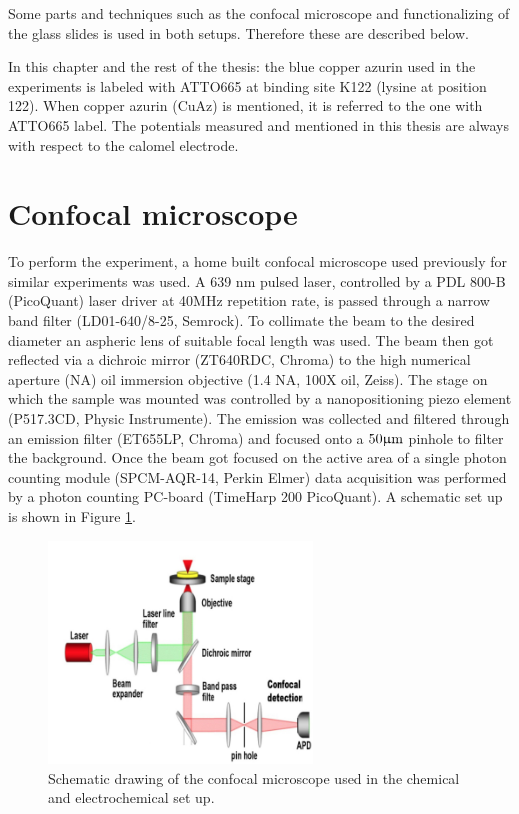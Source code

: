 \documentclass[twoside,single]{lion-msc}
\begin{document}
Some parts and techniques such as the confocal microscope and functionalizing of the glass slides is used in both setups. Therefore these are described below.

In this chapter and the rest of the thesis: the blue copper azurin used in the experiments is  labeled with ATTO665 at binding site K122 (lysine at position 122). When copper azurin (CuAz) is mentioned, it is referred to the one with ATTO665 label.
The potentials measured and mentioned in this thesis are always with respect to the calomel electrode.


\section*{Confocal microscope}  \label{confo_micro}
To perform the experiment, a home built confocal microscope used previously for similar experiments \cite{Gupta2014} was used. A 639 nm pulsed laser, controlled by a PDL 800-B (PicoQuant) laser driver at 40MHz repetition rate, is passed through a narrow band filter (LD01-640/8-25, Semrock). To collimate the beam to the desired diameter an aspheric lens of suitable focal length was used. The beam then got reflected via a dichroic mirror (ZT640RDC, Chroma) to the high numerical aperture (NA) oil immersion objective (1.4 NA, 100X oil, Zeiss). The stage on which the sample was mounted was controlled by a nanopositioning piezo element (P517.3CD, Physic Instrumente). The emission was collected and filtered through an emission filter (ET655LP, Chroma) and focused onto a $50\upmu \textup{m}$ pinhole to filter the background. Once the beam got focused on the active area of a single photon counting module (SPCM-AQR-14, Perkin Elmer) data acquisition was performed by a photon counting PC-board (TimeHarp 200 PicoQuant). A schematic set up is shown in Figure \ref{micros}.

\begin{figure}[ht!]
\centering
\includegraphics[width=70mm]{schem_micros}
\caption{Schematic drawing of the confocal microscope used in the chemical and electrochemical set up. }
\label{micros}
\end{figure}
\end{document}
